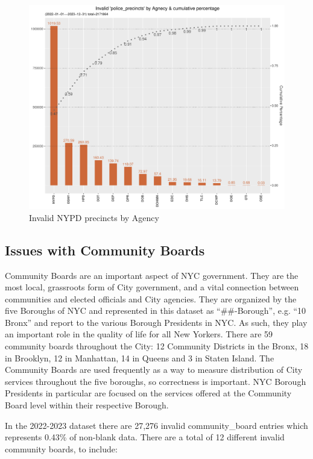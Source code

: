 \documentclass[12pt, titlepage]{article}
\begin{document}
{	\begin{figure}[H]
	  \centering
		  \includegraphics[width=\textwidth]{invalid_police_precincts.pdf}
		  \caption{Invalid NYPD precincts by Agency}
		  \label{fig:invalid_police_precincts_zip}
	\end{figure}

	\subsection{Issues with Community Boards}
	Community Boards are an important aspect of NYC government. They are the most local, grassroots form of City government, 
	and a vital connection between communities and elected officials and City agencies. They are organized by the five Boroughs of NYC and represented
	in this dataset as ``\#\#-Borough'', e.g. ``10 Bronx'' and report to the various Borough Presidents in NYC. As such, they play an important role in the quality of life for all New Yorkers.
	There are 59 community boards throughout the City: 12 Community Districts in the Bronx, 18 in Brooklyn, 12 in Manhattan, 14 in Queens and 3 in Staten Island.
	The Community Boards are used frequently as a way to measure distribution of City services throughout the five boroughs, so correctness is important. 
	NYC Borough Presidents in particular are focused on the services offered at the Community Board level within their respective Borough.
	
	In the 2022-2023 dataset there are 27,276 invalid community\_board entries which represents 0.43\% of non-blank data. 
	There are a total of 12 different invalid community boards, to include: 
	
}
\end{document}
